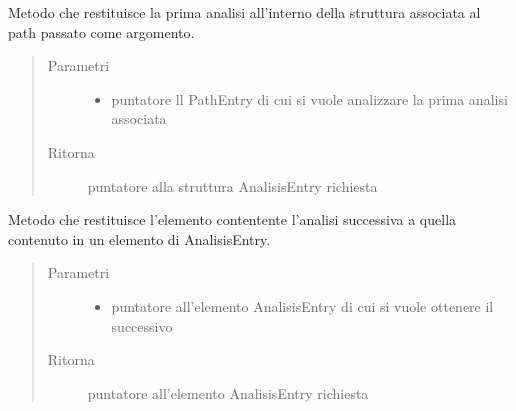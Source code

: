 \documentclass[letterpaper,10pt,italian,openany,oneside]{sphinxmanual}
\begin{document}

\begin{fulllineitems}
\label{\detokenize{code/datastructure:c.getFirstAnalisis}}
Metodo che restituisce la prima analisi all’interno della struttura associata al path passato come argomento.
\begin{quote}\begin{description}
\item[{Parametri}] \leavevmode\begin{itemize}
\item {} 
 \textendash{} puntatore ll PathEntry di cui si vuole analizzare la prima analisi associata

\end{itemize}

\item[{Ritorna}] \leavevmode
puntatore alla struttura AnalisisEntry richiesta

\end{description}\end{quote}

\end{fulllineitems}


\begin{fulllineitems}
\label{\detokenize{code/datastructure:c.getNextAnalisis}}
Metodo che restituisce l’elemento contentente l’analisi successiva a quella contenuto in un elemento di AnalisisEntry.
\begin{quote}\begin{description}
\item[{Parametri}] \leavevmode\begin{itemize}
\item {} 
 \textendash{} puntatore all’elemento AnalisisEntry di cui si vuole ottenere il successivo

\end{itemize}

\item[{Ritorna}] \leavevmode
puntatore all’elemento AnalisisEntry richiesta

\end{description}\end{quote}

\end{fulllineitems}
\end{document}
